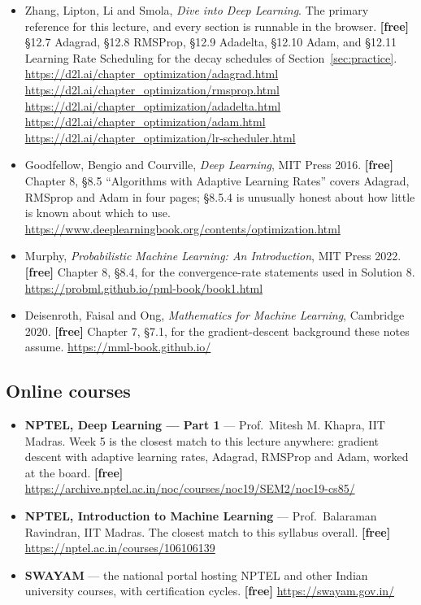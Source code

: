 \documentclass[11pt]{article}
\begin{document}
\begin{itemize}[leftmargin=*]
  \item Zhang, Lipton, Li and Smola, \emph{Dive into Deep Learning}. The primary
    reference for this lecture, and every section is runnable in the browser.
    \textbf{[free]} \S12.7 Adagrad, \S12.8 RMSProp, \S12.9 Adadelta,
    \S12.10 Adam, and \S12.11 Learning Rate Scheduling for the decay schedules
    of Section~\ref{sec:practice}.
    \url{https://d2l.ai/chapter_optimization/adagrad.html} \\
    \url{https://d2l.ai/chapter_optimization/rmsprop.html} \\
    \url{https://d2l.ai/chapter_optimization/adadelta.html} \\
    \url{https://d2l.ai/chapter_optimization/adam.html} \\
    \url{https://d2l.ai/chapter_optimization/lr-scheduler.html}
  \item Goodfellow, Bengio and Courville, \emph{Deep Learning}, MIT Press 2016.
    \textbf{[free]} Chapter 8, \S8.5 ``Algorithms with Adaptive Learning
    Rates'' covers Adagrad, RMSprop and Adam in four pages; \S8.5.4 is
    unusually honest about how little is known about which to use.
    \url{https://www.deeplearningbook.org/contents/optimization.html}
  \item Murphy, \emph{Probabilistic Machine Learning: An Introduction},
    MIT Press 2022. \textbf{[free]} Chapter 8, \S8.4, for the convergence-rate
    statements used in Solution 8.
    \url{https://probml.github.io/pml-book/book1.html}
  \item Deisenroth, Faisal and Ong, \emph{Mathematics for Machine Learning},
    Cambridge 2020. \textbf{[free]} Chapter 7, \S7.1, for the gradient-descent
    background these notes assume. \url{https://mml-book.github.io/}
\end{itemize}

\subsection*{Online courses}

\begin{sloppypar}
\begin{itemize}[leftmargin=*]
  \item \textbf{NPTEL, Deep Learning --- Part 1} --- Prof.\ Mitesh M. Khapra,
    IIT Madras. Week 5 is the closest match to this lecture anywhere: gradient
    descent with adaptive learning rates, Adagrad, RMSProp and Adam, worked at
    the board. \textbf{[free]}
    \url{https://archive.nptel.ac.in/noc/courses/noc19/SEM2/noc19-cs85/}
  \item \textbf{NPTEL, Introduction to Machine Learning} --- Prof.\ Balaraman
    Ravindran, IIT Madras. The closest match to this syllabus overall.
    \textbf{[free]} \url{https://nptel.ac.in/courses/106106139}
  \item \textbf{SWAYAM} --- the national portal hosting NPTEL and other Indian
    university courses, with certification cycles.
    \textbf{[free]} \url{https://swayam.gov.in/}
\end{itemize}
\end{sloppypar}
\end{document}
